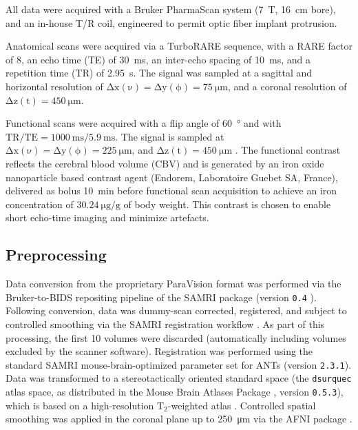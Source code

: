 All data were acquired with a Bruker PharmaScan system (\SI{7}{\tesla}, \SI{16}{\centi\meter} bore), and an in-house T/R coil, engineered to permit optic fiber implant protrusion.

Anatomical scans were acquired via a TurboRARE sequence, with a RARE factor of 8, an echo time (TE) of \SI{30}{\milli\second}, an inter-echo spacing of \SI{10}{\milli\second}, and a repetition time (TR) of \SI{2.95}{\second}.
The signal was sampled at a sagittal and horizontal resolution of $\mathrm{\Delta x(\nu)=\Delta y(\phi)=\SI{75}{\micro\meter}}$, and a coronal resolution of $\mathrm{\Delta z(t)=\SI{450}{\micro\meter}}$.

Functional scans were acquired with a flip angle of \SI{60}{\degree} and with $\mathrm{TR/TE = \SI{1000}{\milli\second}/\SI{5.9}{\milli\second}}$.
The signal is sampled at $\mathrm{\Delta x(\nu)=\Delta y(\phi)=\SI{225}{\micro\meter}}$, and $\mathrm{\Delta z(t)=\SI{450}{\micro\meter}}$ .
The functional contrast reflects the cerebral blood volume (CBV) and is generated by an iron oxide nanoparticle based contrast agent (Endorem, Laboratoire Guebet SA, France), delivered as bolus \SI{10}{\minute} before functional scan acquisition to achieve an iron concentration of $\SI{30.24}{\micro\gram\per\gram}$ of body weight.
This contrast is chosen to enable short echo-time imaging and minimize artefacts.

\subsection{Preprocessing}

Data conversion from the proprietary ParaVision format was performed via the Bruker-to-BIDS repositing pipeline \cite{aowsis} of the SAMRI package (version \textcolor{mg}{\texttt{0.4}} \cite{samri}).
Following conversion, data was dummy-scan corrected, registered, and subject to controlled smoothing via the SAMRI registration workflow \cite{irsabi}.
As part of this processing, the first 10 volumes were discarded (automatically including volumes excluded by the scanner software).
Registration was performed using the standard SAMRI mouse-brain-optimized parameter set for ANTs \cite{ants} (version \textcolor{mg}{\texttt{2.3.1}}).
Data was transformed to a stereotactically oriented standard space (the \textcolor{mg}{\texttt{dsurquec}} atlas space, as distributed in the Mouse Brain Atlases Package \cite{atlases_generator}, version \textcolor{mg}{\texttt{0.5.3}}), which is based on a high-resolution $\mathrm{T_2}$-weighted atlas \cite{dsu}.
Controlled spatial smoothing was applied in the coronal plane up to \SI{250}{\micro\meter} via the AFNI package \cite{afni}.

